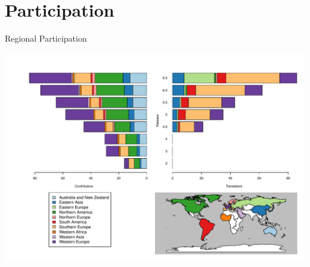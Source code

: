 \documentclass{beamer}
\begin{document}
\section{Participation}
\begin{frame}{Regional Participation}
\vspace{-.3in}
	\begin{center}
		\includegraphics[width=1\textwidth]{RegionalParticipation.pdf}
		
	\end{center}
\end{frame}
\end{document}

